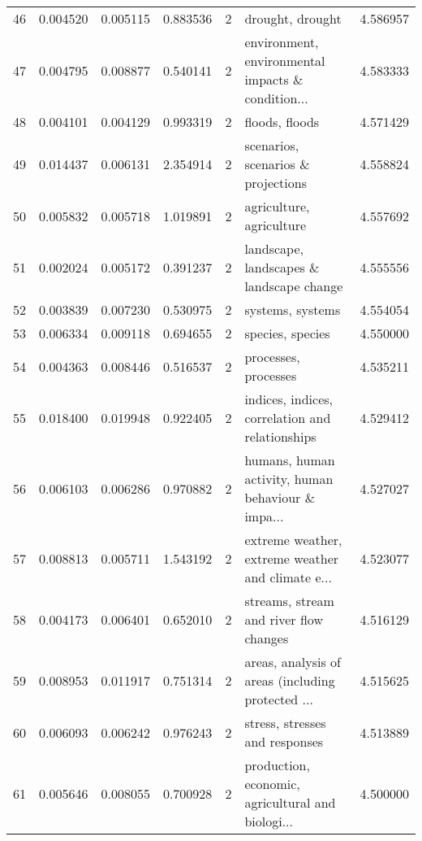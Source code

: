 \begin{tabular}{lrrrrlr}
46  &    0.004520 &  0.005115 &        0.883536 &           2 &                                   drought, drought &  4.586957 \\
47  &    0.004795 &  0.008877 &        0.540141 &           2 &  environment, environmental impacts \& condition... &  4.583333 \\
48  &    0.004101 &  0.004129 &        0.993319 &           2 &                                     floods, floods &  4.571429 \\
49  &    0.014437 &  0.006131 &        2.354914 &           2 &                 scenarios, scenarios \& projections &  4.558824 \\
50  &    0.005832 &  0.005718 &        1.019891 &           2 &                           agriculture, agriculture &  4.557692 \\
51  &    0.002024 &  0.005172 &        0.391237 &           2 &           landscape, landscapes \& landscape change &  4.555556 \\
52  &    0.003839 &  0.007230 &        0.530975 &           2 &                                   systems, systems &  4.554054 \\
53  &    0.006334 &  0.009118 &        0.694655 &           2 &                                   species, species &  4.550000 \\
54  &    0.004363 &  0.008446 &        0.516537 &           2 &                               processes, processes &  4.535211 \\
55  &    0.018400 &  0.019948 &        0.922405 &           2 &    indices, indices, correlation and relationships &  4.529412 \\
56  &    0.006103 &  0.006286 &        0.970882 &           2 &  humans, human activity, human behaviour \& impa... &  4.527027 \\
57  &    0.008813 &  0.005711 &        1.543192 &           2 &  extreme weather, extreme weather and climate e... &  4.523077 \\
58  &    0.004173 &  0.006401 &        0.652010 &           2 &             streams, stream and river flow changes &  4.516129 \\
59  &    0.008953 &  0.011917 &        0.751314 &           2 &  areas, analysis of areas (including protected ... &  4.515625 \\
60  &    0.006093 &  0.006242 &        0.976243 &           2 &                     stress, stresses and responses &  4.513889 \\
61  &    0.005646 &  0.008055 &        0.700928 &           2 &  production, economic, agricultural and biologi... &  4.500000 \\

\end{tabular}
